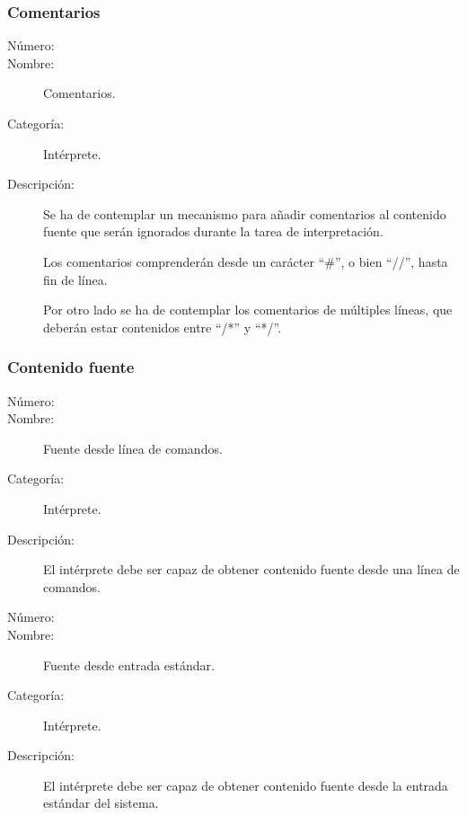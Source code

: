 \subsubsection{Comentarios}
\begin{framed}
	\begin{description}
		\item [Número:] \cn
		\item [Nombre:] Comentarios.
		\item [Categoría:] Intérprete.
		\item [Descripción:] Se ha de contemplar un mecanismo para añadir comentarios al contenido fuente que serán ignorados
		durante la tarea de interpretación. 
      
      Los comentarios comprenderán desde un carácter ``\#'', o bien ``//'', hasta fin de línea.
      
      Por otro lado se ha de contemplar los comentarios de múltiples líneas, que deberán estar contenidos entre ``/*'' y ``*/''.
	\end{description}
\end{framed}

\subsubsection{Contenido fuente}
\begin{framed}
	\begin{description}
		\item [Número:] \cn
		\item [Nombre:] Fuente desde línea de comandos.
		\item [Categoría:] Intérprete.
		\item [Descripción:] El intérprete debe ser capaz de obtener contenido fuente desde una línea de comandos.
	\end {description}
\end{framed}

\begin{framed}
	\begin{description}
		\item [Número:] \cn
		\item [Nombre:] Fuente desde entrada estándar.
		\item [Categoría:] Intérprete.
		\item [Descripción:] El intérprete debe ser capaz de obtener contenido fuente desde la entrada estándar del sistema.
	\end {description}
\end{framed}

